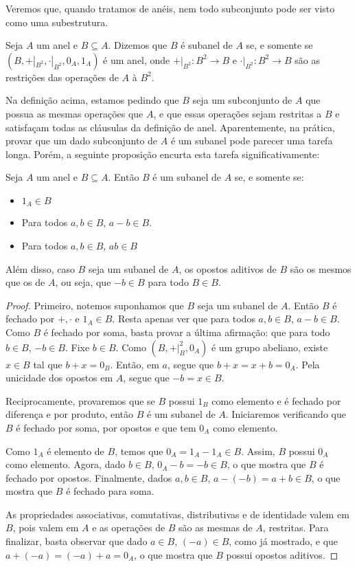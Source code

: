 Veremos que, quando tratamos de anéis, nem todo subconjunto pode ser visto como uma subestrutura.

\begin{definition}[Subanel]
    Seja $A$ um anel e $B \subseteq A$. Dizemos que $B$ é subanel de $A$ se, e somente se $(B, +|_{B^2}, \cdot|_{B^2}, 0_A, 1_A)$ é um anel, onde $+|_{B^2}:B^2\rightarrow B$ e $\cdot|_{B^2}:B^2\rightarrow B$ são as restrições das operações de $A$ à $B^2$.
\end{definition}

Na definição acima, estamos pedindo que $B$ seja um subconjunto de $A$ que possua as mesmas operações que $A$, e que essas operações sejam restritas a $B$ e satisfaçam todas as cláusulas da definição de anel. Aparentemente, na prática, provar que um dado subconjunto de $A$ é um subanel pode parecer uma tarefa longa. Porém, a seguinte proposição encurta esta tarefa significativamente: 

\begin{definition}[Subanel]
    Seja $A$ um anel e $B\subseteq A$. Então $B$ é um subanel de $A$ se, e somente se:
    \begin{itemize}
        \item $1_A \in B$
        \item Para todos $a, b \in B$, $a-b \in B$.
        \item Para todos $a, b \in B$, $ab\in B$
    \end{itemize}

    Além disso, caso $B$ seja um subanel de $A$, os opostos aditivos de $B$ são os mesmos que os de $A$, ou seja, que $-b \in B$ para todo $B \in B$.
\end{definition}

\begin{proof}
    Primeiro, notemos suponhamos que $B$ seja um subanel de $A$. Então $B$ é fechado por $+, \cdot$ e $1_A\in B$. Resta apenas ver que para todos $a, b \in B$, $a-b \in B$.
    Como $B$ é fechado por soma, basta provar a última afirmação: que para todo $b \in B$, $-b \in B$.
    Fixe $b \in B$. Como $(B, +|_B^2, 0_A)$ é um grupo abeliano, existe $x \in B$ tal que $b+x=0_B$. Então, em $a$, segue que $b+x=x+b=0_A$. Pela unicidade dos opostos em $A$, segue que $-b=x\in B$.

    Reciprocamente, provaremos que se $B$ possui $1_B$ como elemento e é fechado por diferença e por produto, então $B$ é um subanel de $A$. Iniciaremos verificando que $B$ é fechado por soma, por opostos e que tem $0_A$ como elemento.

    Como $1_A$ é elemento de $B$, temos que $0_A=1_A-1_A\in B$. Assim, $B$ possui $0_A$ como elemento. Agora, dado $b \in B$, $0_A-b=-b \in B$, o que mostra que $B$ é fechado por opostos. Finalmente, dados $a, b \in B$, $a-(-b)=a+b\in B$, o que mostra que $B$ é fechado para soma.

    As propriedades associativas, comutativas, distributivas e de identidade valem em $B$, pois valem em $A$ e as operações de $B$ são as mesmas de $A$, restritas. Para finalizar, basta observar que dado $a \in B$, $(-a)\in B$, como já mostrado, e que $a+(-a)=(-a)+a=0_A$, o que mostra que $B$ possui opostos aditivos.
\end{proof}

